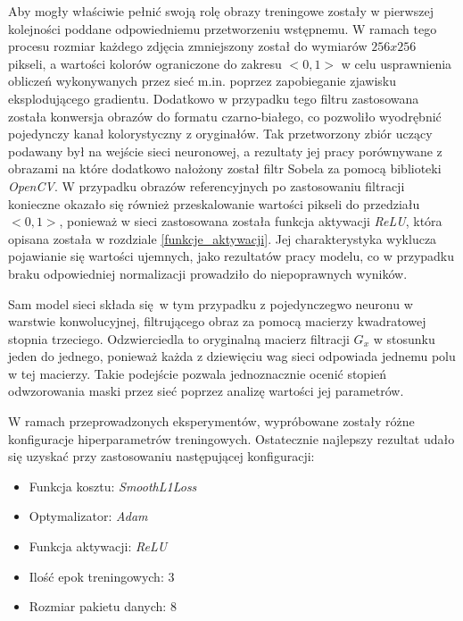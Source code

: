     Aby mogły właściwie pełnić swoją rolę obrazy treningowe zostały w pierwszej kolejności
    poddane odpowiedniemu przetworzeniu wstępnemu. W ramach tego procesu rozmiar każdego zdjęcia
    zmniejszony został do wymiarów $256x256$ pikseli, a wartości kolorów ograniczone
    do zakresu $<0, 1>$ w celu usprawnienia obliczeń wykonywanych przez sieć m.in.
    poprzez zapobieganie zjawisku eksplodującego gradientu. Dodatkowo w przypadku tego
    filtru zastosowana została konwersja obrazów do formatu czarno-białego, co pozwoliło
    wyodrębnić pojedynczy kanał kolorystyczny z oryginałów. Tak przetworzony zbiór uczący
    podawany był na wejście sieci neuronowej, a rezultaty jej pracy porównywane
    z obrazami na które dodatkowo nałożony został filtr Sobela za pomocą biblioteki
    \textit{OpenCV}. W przypadku obrazów referencyjnych po zastosowaniu filtracji
    konieczne okazało się również przeskalowanie wartości pikseli do przedziału
    $<0, 1>$, ponieważ w sieci zastosowana została funkcja aktywacji \textit{ReLU}, która
    opisana została w rozdziale \ref{funkcje_aktywacji}. Jej charakterystyka
    wyklucza pojawianie się wartości ujemnych, jako rezultatów pracy modelu, co
    w przypadku braku odpowiedniej normalizacji prowadziło do niepoprawnych wyników.

    Sam model sieci składa się w tym przypadku z pojedynczegwo neuronu w warstwie
    konwolucyjnej, filtrującego obraz za pomocą macierzy kwadratowej stopnia
    trzeciego. Odzwierciedla to oryginalną macierz filtracji $G_x$ w stosunku jeden
    do jednego, ponieważ każda z dziewięciu wag sieci odpowiada jednemu polu w tej
    macierzy. Takie podejście pozwala jednoznacznie ocenić stopień odwzorowania
    maski przez sieć poprzez analizę wartości jej parametrów.

    W ramach przeprowadzonych eksperymentów, wypróbowane zostały różne konfiguracje
    hiperparametrów treningowych. Ostatecznie najlepszy rezultat udało się uzyskać
    przy zastosowaniu następującej konfiguracji:

    \begin{itemize}
    \item Funkcja kosztu: \textit{SmoothL1Loss}
    \item Optymalizator: \textit{Adam}
    \item Funkcja aktywacji: \textit{ReLU}
    \item Ilość epok treningowych: 3
    \item Rozmiar pakietu danych: 8
    \end{itemize}

